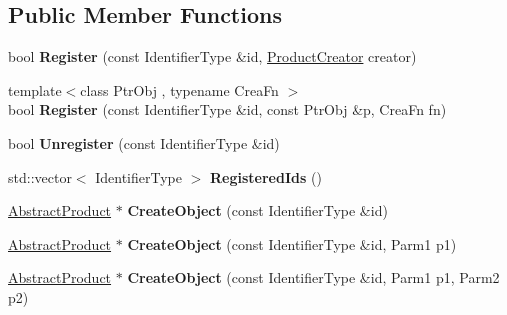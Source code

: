 \subsection*{Public Member Functions}
\begin{DoxyCompactItemize}
\item 
\hypertarget{classLoki_1_1Factory_a1fe1c9ff8f93936f802ad5b74865ce56}{}bool {\bfseries Register} (const Identifier\+Type \&id, \hyperlink{classLoki_1_1Functor}{Product\+Creator} creator)\label{classLoki_1_1Factory_a1fe1c9ff8f93936f802ad5b74865ce56}

\item 
\hypertarget{classLoki_1_1Factory_a9380961aeadfbba65b0ba60f65565068}{}{\footnotesize template$<$class Ptr\+Obj , typename Crea\+Fn $>$ }\\bool {\bfseries Register} (const Identifier\+Type \&id, const Ptr\+Obj \&p, Crea\+Fn fn)\label{classLoki_1_1Factory_a9380961aeadfbba65b0ba60f65565068}

\item 
\hypertarget{classLoki_1_1Factory_af5f32e5f2d4097ef31f8a610d120b234}{}bool {\bfseries Unregister} (const Identifier\+Type \&id)\label{classLoki_1_1Factory_af5f32e5f2d4097ef31f8a610d120b234}

\item 
\hypertarget{classLoki_1_1Factory_a752cf0d625f76b62acaf564a74f794de}{}std\+::vector$<$ Identifier\+Type $>$ {\bfseries Registered\+Ids} ()\label{classLoki_1_1Factory_a752cf0d625f76b62acaf564a74f794de}

\item 
\hypertarget{classLoki_1_1Factory_a59af5cbd7048faf0991c1087322a6c19}{}\hyperlink{classAbstractProduct}{Abstract\+Product} $\ast$ {\bfseries Create\+Object} (const Identifier\+Type \&id)\label{classLoki_1_1Factory_a59af5cbd7048faf0991c1087322a6c19}

\item 
\hypertarget{classLoki_1_1Factory_a53083831d400ea0599e26a02bed2c3bf}{}\hyperlink{classAbstractProduct}{Abstract\+Product} $\ast$ {\bfseries Create\+Object} (const Identifier\+Type \&id, Parm1 p1)\label{classLoki_1_1Factory_a53083831d400ea0599e26a02bed2c3bf}

\item 
\hypertarget{classLoki_1_1Factory_a9dc37b2f74f057ce82ee4f471ac484aa}{}\hyperlink{classAbstractProduct}{Abstract\+Product} $\ast$ {\bfseries Create\+Object} (const Identifier\+Type \&id, Parm1 p1, Parm2 p2)\label{classLoki_1_1Factory_a9dc37b2f74f057ce82ee4f471ac484aa}


\end{DoxyCompactItemize}
